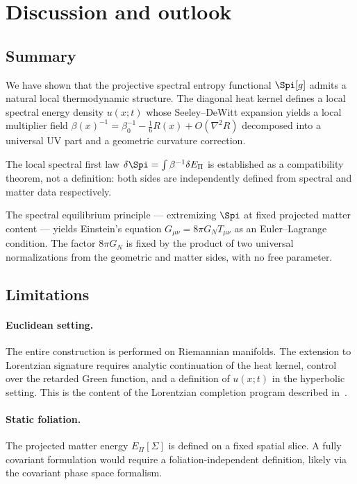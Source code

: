 \section{Discussion and outlook}
  \label{sec:discussion}

  \subsection{Summary}
    \label{subsec:summary}

    We have shown that the projective spectral entropy functional $\Spi[g]$ admits
    a natural local thermodynamic structure.
    The diagonal heat kernel defines a local spectral energy density $u(x;t)$ whose
    Seeley--DeWitt expansion yields a local multiplier field
    $\beta(x)^{-1} = \beta_0^{-1} - \frac{1}{6}R(x) + O(\nabla^2 R)$
    decomposed into a universal UV part and a geometric curvature correction.

    The local spectral first law $\delta\Spi = \int\beta^{-1}\delta E_\Pi$ is
    established as a compatibility theorem, not a definition: both sides are
    independently defined from spectral and matter data respectively.

    The spectral equilibrium principle --- extremizing $\Spi$ at fixed projected
    matter content --- yields Einstein's equation $G_{\mu\nu} = 8\pi G_N T_{\mu\nu}$
    as an Euler--Lagrange condition.
    The factor $8\pi G_N$ is fixed by the product of two universal normalizations from
    the geometric and matter sides, with no free parameter.

  \subsection{Limitations}
    \label{subsec:limitations}

    \paragraph{Euclidean setting.}
      The entire construction is performed on Riemannian manifolds.
      The extension to Lorentzian signature requires analytic continuation of the heat
      kernel, control over the retarded Green function, and a definition of $u(x;t)$ in
      the hyperbolic setting.
      This is the content of the Lorentzian completion program described in~\cite{Gravity20}.

    \paragraph{Static foliation.}
      The projected matter energy $E_\Pi[\Sigma]$ is defined on a fixed spatial slice.
      A fully covariant formulation would require a foliation-independent definition,
      likely via the covariant phase space formalism.

